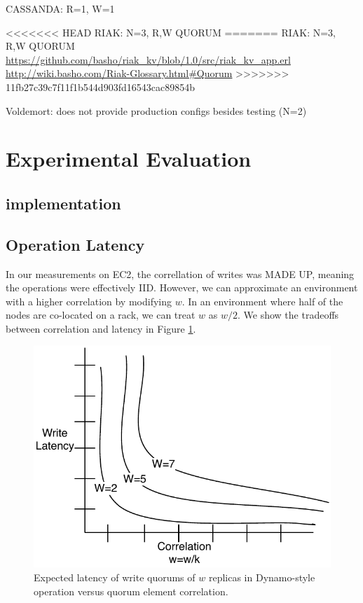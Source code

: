 \documentclass{vldb}
\begin{document}
CASSANDA: R=1, W=1 

<<<<<<< HEAD
RIAK: N=3, R,W QUORUM 
=======
RIAK: N=3, R,W QUORUM \url{https://github.com/basho/riak_kv/blob/1.0/src/riak_kv_app.erl}
\url{http://wiki.basho.com/Riak-Glossary.html#Quorum}
>>>>>>> 11fb27c39c7f11f1b544d903fd16543cac89854b

Voldemort: does not provide production configs besides testing (N=2)

\section{Experimental Evaluation}
\label{sec:eval}

\subsection{implementation}

\subsection{Operation Latency}
\label{sec:real-latency}

In our measurements on EC2, the correllation of writes was MADE UP,
meaning the operations were effectively IID.  However, we can
approximate an environment with a higher correlation by modifying $w$.
In an environment where half of the nodes are co-located on a rack, we can treat $w$ as $w/2$.  We show the tradeoffs between correlation and latency in Figure \ref{fig:correlation}.

\begin{figure}
\centering
\includegraphics[width=.8\columnwidth]{figs/correlation.pdf}
\caption{Expected latency of write quorums of $w$ replicas in Dynamo-style operation versus quorum element correlation.}
\label{fig:correlation}
\end{figure}
\end{document}
